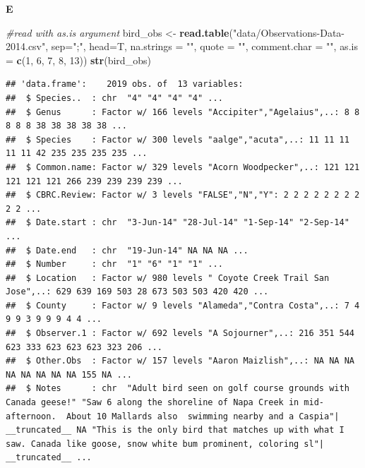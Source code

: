 \documentclass[]{book}
\newenvironment{Shaded}{\begin{snugshade}}{\end{snugshade}}
\newcommand{\CommentTok}[1]{\textcolor[rgb]{0.56,0.35,0.01}{\textit{#1}}}
\newcommand{\DataTypeTok}[1]{\textcolor[rgb]{0.13,0.29,0.53}{#1}}
\newcommand{\DecValTok}[1]{\textcolor[rgb]{0.00,0.00,0.81}{#1}}
\newcommand{\KeywordTok}[1]{\textcolor[rgb]{0.13,0.29,0.53}{\textbf{#1}}}
\newcommand{\NormalTok}[1]{#1}
\newcommand{\StringTok}[1]{\textcolor[rgb]{0.31,0.60,0.02}{#1}}
\begin{document}
\textbf{E}

\begin{Shaded}
\begin{Highlighting}[]
\CommentTok{#read with as.is argument}
\NormalTok{bird_obs <-}\StringTok{ }\KeywordTok{read.table}\NormalTok{(}\StringTok{"data/Observations-Data-2014.csv"}\NormalTok{,}
                                \DataTypeTok{sep=}\StringTok{";"}\NormalTok{,}
                                \DataTypeTok{head=}\NormalTok{T,}
                                \DataTypeTok{na.strings =} \StringTok{""}\NormalTok{,}
                                \DataTypeTok{quote =} \StringTok{""}\NormalTok{,}
                                \DataTypeTok{comment.char =} \StringTok{""}\NormalTok{,}
                                \DataTypeTok{as.is =} \KeywordTok{c}\NormalTok{(}\DecValTok{1}\NormalTok{, }\DecValTok{6}\NormalTok{, }\DecValTok{7}\NormalTok{, }\DecValTok{8}\NormalTok{, }\DecValTok{13}\NormalTok{))}
\KeywordTok{str}\NormalTok{(bird_obs)}
\end{Highlighting}
\end{Shaded}

\begin{verbatim}
## 'data.frame':    2019 obs. of  13 variables:
##  $ Species..  : chr  "4" "4" "4" "4" ...
##  $ Genus      : Factor w/ 166 levels "Accipiter","Agelaius",..: 8 8 8 8 8 38 38 38 38 38 ...
##  $ Species    : Factor w/ 300 levels "aalge","acuta",..: 11 11 11 11 11 42 235 235 235 235 ...
##  $ Common.name: Factor w/ 329 levels "Acorn Woodpecker",..: 121 121 121 121 121 266 239 239 239 239 ...
##  $ CBRC.Review: Factor w/ 3 levels "FALSE","N","Y": 2 2 2 2 2 2 2 2 2 2 ...
##  $ Date.start : chr  "3-Jun-14" "28-Jul-14" "1-Sep-14" "2-Sep-14" ...
##  $ Date.end   : chr  "19-Jun-14" NA NA NA ...
##  $ Number     : chr  "1" "6" "1" "1" ...
##  $ Location   : Factor w/ 980 levels " Coyote Creek Trail San Jose",..: 629 639 169 503 28 673 503 503 420 420 ...
##  $ County     : Factor w/ 9 levels "Alameda","Contra Costa",..: 7 4 9 9 3 9 9 9 4 4 ...
##  $ Observer.1 : Factor w/ 692 levels "A Sojourner",..: 216 351 544 623 333 623 623 623 323 206 ...
##  $ Other.Obs  : Factor w/ 157 levels "Aaron Maizlish",..: NA NA NA NA NA NA NA NA 155 NA ...
##  $ Notes      : chr  "Adult bird seen on golf course grounds with Canada geese!" "Saw 6 along the shoreline of Napa Creek in mid-afternoon.  About 10 Mallards also  swimming nearby and a Caspia"| __truncated__ NA "This is the only bird that matches up with what I saw. Canada like goose, snow white bum prominent, coloring sl"| __truncated__ ...
\end{verbatim}
\end{document}
